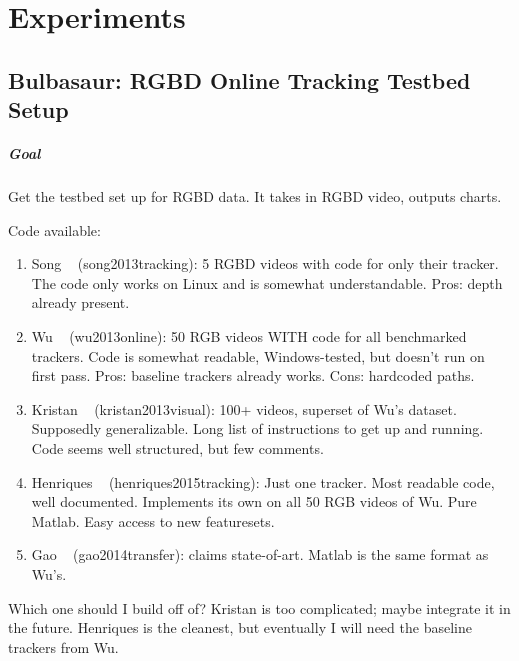 \chapter{Experiments}
\label{ch:experiments}

\section{Bulbasaur: RGBD Online Tracking Testbed Setup}
\label{exp:Bulbasaur}
\paragraph{Goal} Get the testbed set up for RGBD data. It takes in RGBD video, outputs charts.

Code available:
\begin{enumerate}
\item Song \etal~\cite{song2013tracking} (song2013tracking): 5 RGBD videos with code for only their tracker. The code only works on Linux and is somewhat understandable. Pros: depth already present.
\item Wu \etal~\cite{wu2013online} (wu2013online): 50 RGB videos WITH code for all benchmarked trackers. Code is somewhat readable, Windows-tested, but doesn't run on first pass. Pros: baseline trackers already works. Cons: hardcoded paths.
\item Kristan \etal~\cite{kristan2013visual} (kristan2013visual): 100+ videos, superset of Wu's dataset. Supposedly generalizable. Long list of instructions to get up and running. Code seems well structured, but few comments.
\item Henriques \etal~\cite{henriques2015tracking} (henriques2015tracking): Just one tracker. Most readable code, well documented. Implements its own on all 50 RGB videos of Wu. Pure Matlab. Easy access to new featuresets.
\item Gao \etal~\cite{gao2014transfer} (gao2014transfer): claims state-of-art. Matlab is the same format as Wu's.
\end{enumerate}

Which one should I build off of? Kristan is too complicated; maybe integrate it in the future. Henriques is the cleanest, but eventually I will need the baseline trackers from Wu.

